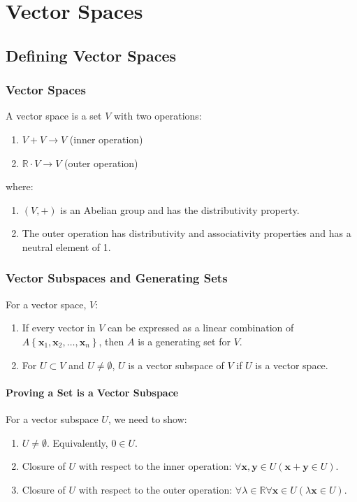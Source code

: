 \documentclass[10pt,twoside,twocolumn]{article}
\newcommand{\R}[0]{\mathds{R}} %
\begin{document}
\section{Vector Spaces}


\subsection{Defining Vector Spaces}


\subsubsection{Vector Spaces}

A vector space is a set $V$ with two operations: 
\begin{enumerate}
\item $V+V\rightarrow V$ (inner operation) 
\item $\R\cdot V\rightarrow V$ (outer operation) 
\end{enumerate}
where: 
\begin{enumerate}
\item $\left(V,+\right)$ is an Abelian group and has the distributivity
property. 
\item The outer operation has distributivity and associativity properties
and has a neutral element of 1. 
\end{enumerate}

\subsubsection{Vector Subspaces and Generating Sets}

For a vector space, $V$: 
\begin{enumerate}
\item If every vector in $V$ can be expressed as a linear combination of
$A\left\{ \mathbf{x}_{1},\mathbf{x}_{2},\dots,\mathbf{x}_{n}\right\} $,
then $A$ is a generating set for $V$. 
\item For $U\subset V$ and $U\neq\emptyset$, $U$ is a vector subspace
of $V$ if $U$ is a vector space. 
\end{enumerate}

\paragraph{Proving a Set is a Vector Subspace}

For a vector subspace $U$, we need to show: 
\begin{enumerate}
\item $U\neq\emptyset$. Equivalently, $0\in U$. 
\item Closure of $U$ with respect to the inner operation: $\forall\mathbf{x},\mathbf{y}\in U\left(\mathbf{x}+\mathbf{y}\in U\right)$. 
\item Closure of $U$ with respect to the outer operation: $\forall\lambda\in\R\forall\mathbf{x}\in U\left(\lambda\mathbf{x}\in U\right)$. 
\end{enumerate}
\end{document}
